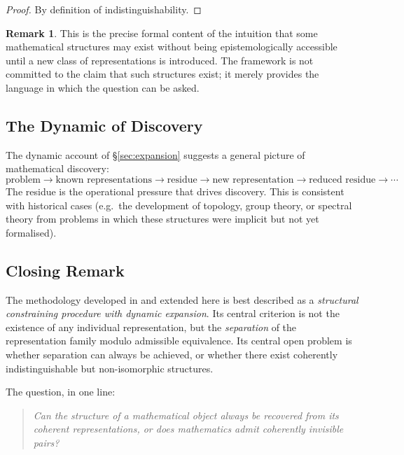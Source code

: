 \documentclass[11pt,a4paper]{article}
\theoremstyle{definition}
\newtheorem{remark}[definition]{Remark}
\theoremstyle{plain}
\begin{document}
\begin{proof}
By definition of indistinguishability.
\end{proof}

\begin{remark}
This is the precise formal content of the intuition that some
mathematical structures may exist without being epistemologically
accessible until a new class of representations is introduced. The
framework is not committed to the claim that such structures
exist; it merely provides the language in which the question can be
asked.
\end{remark}

\subsection{The Dynamic of Discovery}

The dynamic account of \S\ref{sec:expansion} suggests a
general picture of mathematical discovery:
\[
  \text{problem} \to \text{known representations}
  \to \text{residue} \to \text{new representation}
  \to \text{reduced residue} \to \cdots
\]
The residue is the operational pressure that drives discovery. This
is consistent with historical cases (e.g.\ the development of
topology, group theory, or spectral theory from problems in which
these structures were implicit but not yet formalised).

\subsection{Closing Remark}

The methodology developed in \cite{paperI} and extended here is
best described as a \emph{structural constraining procedure with
dynamic expansion}. Its central criterion is not the existence of
any individual representation, but the \emph{separation} of the
representation family modulo admissible equivalence. Its central
open problem is whether separation can always be achieved, or
whether there exist coherently indistinguishable but
non-isomorphic structures.

The question, in one line:

\begin{quote}
\emph{Can the structure of a mathematical object always be
recovered from its coherent representations, or does mathematics
admit coherently invisible pairs?}
\end{quote}

\appendix
\end{document}
